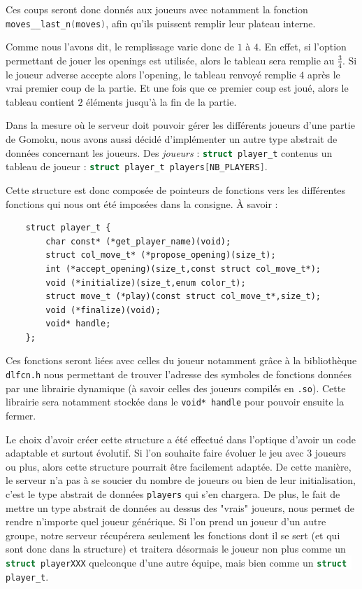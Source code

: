 \documentclass[a4paper,11pt]{article}
\newcommand{\inlinecode}[2]{\colorbox{white}{\lstinline[language=#1]$#2$}}
\begin{document}
Ces coups seront donc donnés aux joueurs avec notamment la fonction \inlinecode{C}{moves__last_n(moves)}, afin qu'ils puissent remplir leur plateau interne.

Comme nous l'avons dit, le remplissage varie donc de $1$ à $4$. En effet, si l'option permettant de jouer les openings est utilisée, alors le tableau sera remplie au $\frac{3}{4}$. Si le joueur adverse accepte alors l'opening, le tableau renvoyé remplie $4$ après le vrai premier coup de la partie. Et une fois que ce premier coup est joué, alors le tableau contient $2$ éléments jusqu'à la fin de la partie.

\bigbreak

Dans la mesure où le serveur doit pouvoir gérer les différents joueurs d'une partie de Gomoku, nous avons aussi décidé d'implémenter un autre type abstrait de données concernant les joueurs. Des \textit{joueurs} : \inlinecode{C}{struct player_t} contenus un tableau de joueur : \inlinecode{C}{struct player_t players[NB_PLAYERS]}.

Cette structure est donc composée de pointeurs de fonctions vers les différentes fonctions qui nous ont été imposées dans la consigne. \`A savoir :

\begin{lstlisting}
    struct player_t {
        char const* (*get_player_name)(void);
        struct col_move_t* (*propose_opening)(size_t);
        int (*accept_opening)(size_t,const struct col_move_t*);
        void (*initialize)(size_t,enum color_t);
        struct move_t (*play)(const struct col_move_t*,size_t);
        void (*finalize)(void);
        void* handle;
    };
\end{lstlisting}
\label{lst:struct_player_t}

Ces fonctions seront liées avec celles du joueur notamment grâce à la bibliothèque \verb+dlfcn.h+ nous permettant de trouver l'adresse des symboles de fonctions données par une librairie dynamique (à savoir celles des joueurs compilés en \verb+.so+). Cette librairie sera notamment stockée dans le \verb+void* handle+ pour pouvoir ensuite la fermer.

Le choix d'avoir créer cette structure a été effectué dans l'optique d'avoir un code adaptable et surtout évolutif. Si l'on souhaite faire évoluer le jeu avec $3$ joueurs ou plus, alors cette structure pourrait être facilement adaptée. De cette manière, le serveur n'a pas à se soucier du nombre de joueurs ou bien de leur initialisation, c'est le type abstrait de données \verb+players+ qui s'en chargera.
De plus, le fait de mettre un type abstrait de données au dessus des "vrais" joueurs, nous permet de rendre n'importe quel joueur générique. Si l'on prend un joueur d'un autre groupe, notre serveur récupérera seulement les fonctions dont il se sert (et qui sont donc dans la structure) et traitera désormais le joueur non plus comme un \inlinecode{C}{struct playerXXX} quelconque d'une autre équipe, mais bien comme un \inlinecode{C}{struct player_t}.
\end{document}
